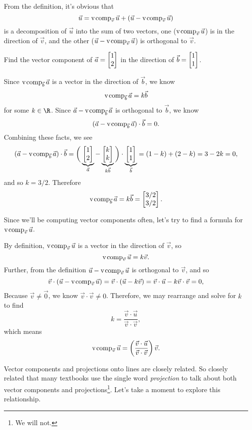 
From the definition, it's obvious that
\[
	\vec u=\operatorname{v\hspace{1pt}comp}_{\vec v}\vec u + (\vec u-\operatorname{v\hspace{1pt}comp}_{\vec v}\vec u)
\]
is a decomposition of $\vec u$ into the sum of two vectors, one ($\operatorname{v\hspace{1pt}comp}_{\vec v}\vec u$) is in the direction of $\vec v$,
and the other ($\vec u-\operatorname{v\hspace{1pt}comp}_{\vec v}\vec u$) is orthogonal to $\vec v$.

\begin{example}
	Find the vector component of $\vec a=\mat{1\\2}$ in the direction of $\vec b=\mat{1\\1}$.

	Since $\operatorname{v\hspace{1pt}comp}_{\vec b}\vec a$ is a vector in the direction of $\vec b$, we know
	\[
		\operatorname{v\hspace{1pt}comp}_{\vec b}\vec a = k\vec b
	\]
	for some $k\in \R$. Since $\vec a-\operatorname{v\hspace{1pt}comp}_{\vec b}\vec a$ is orthogonal to $\vec b$, we know
	\[
		(\vec a-\operatorname{v\hspace{1pt}comp}_{\vec b}\vec a)\cdot \vec b=0.
	\]
	Combining these facts, we see
	\[
		(\vec a-\Vcomp_{\vec b}\vec a)\cdot \vec b = \bigg(\underbrace{\mat{1\\2}}_{\vec a}-\underbrace{\mat{k\\k}}_{k\vec b}\bigg)\cdot 
		\underbrace{\mat{1\\1}}_{\vec b} =(1-k)+(2-k)=3-2k=0,
	\]
	and so $k=3/2$. Therefore
	\[
		\Vcomp_{\vec b}\vec a=k\vec b=\mat{3/2\\3/2}.
	\]
\end{example}

Since we'll be computing vector components often, let's try to find a formula for $\operatorname{v\hspace{1pt}comp}_{\vec v}\vec u$.

By definition, $\operatorname{v\hspace{1pt}comp}_{\vec v}\vec u$ is a vector in the direction of $\vec v$, so
\[
	\operatorname{v\hspace{1pt}comp}_{\vec v}\vec u = k\vec v.
\]
Further, from the definition $\vec u-\operatorname{v\hspace{1pt}comp}_{\vec v}\vec u$ is orthogonal to $\vec v$, and so
\[
	\vec v\cdot (\vec u-\operatorname{v\hspace{1pt}comp}_{\vec v}\vec u) = \vec v\cdot (\vec u-k\vec v)=\vec v\cdot \vec u-k\vec v\cdot \vec v=0,
\]
Because $\vec v\neq \vec 0$, we know $\vec v\cdot \vec v\neq 0$. Therefore, we may rearrange and solve for $k$ to find
\[
	k=\frac{\vec v\cdot \vec u}{\vec v\cdot \vec v},
\]
which means
\[
	\operatorname{v\hspace{1pt}comp}_{\vec v}\vec u = \left(\frac{\vec v\cdot \vec u}{\vec v\cdot \vec v}\right)\vec v.
\]


Vector components and projections onto lines are closely related. So closely related that many textbooks
use the single word \emph{projection} to talk about both vector components and projections\footnote{ We will not.}. Let's take a moment
to explore this relationship.

